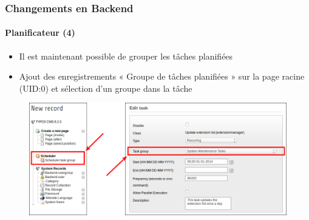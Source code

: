\begin{frame}[fragile]
	\frametitle{Changements en Backend}
	\framesubtitle{Planificateur (4)}

	\begin{itemize}
		\item Il est maintenant possible de grouper les tâches planifiées
		\item Ajout des enregistrements « Groupe de tâches planifiées » sur la page racine (UID:0) et sélection d'un groupe dans la tâche
	\end{itemize}

	\begin{figure}
		\includegraphics[width=0.85\linewidth]{Images/BackendChanges/SchedulerTaskGroup.png}
	\end{figure}

\end{frame}


